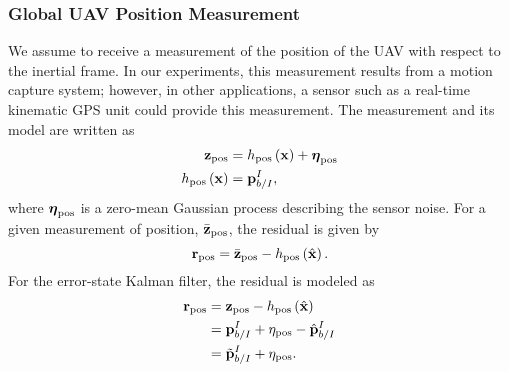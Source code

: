 \subsubsection{Global UAV Position Measurement}
We assume to receive a measurement of the position of the UAV with respect to
the inertial frame.
In our experiments, this measurement results from a motion capture system;
however, in other applications,
a sensor such as a real-time kinematic GPS unit could provide this measurement.
The measurement and its model are
written as
\begin{align}
  \boldsymbol{\mathrm{z}}_{\text{pos}} &= h_{\text{pos}} \left( \boldsymbol{\mathrm{x}} \right) + \boldsymbol{\mathrm{\eta}}_{\text{pos}} \\
  h_{\text{pos}} \left( \boldsymbol{\mathrm{x}} \right) &= \boldsymbol{\mathrm{p}}_{b/I}^I,
\end{align}
where $\boldsymbol{\mathrm{\eta}}_{\text{pos}}$ is a zero-mean Gaussian process
describing the sensor noise.
For a given measurement of position, $\bar{\boldsymbol{\mathrm{z}}}_{\text{pos}}$, the residual is
given by
\begin{equation}
  \boldsymbol{\mathrm{r}}_{\text{pos}} = \bar{\boldsymbol{\mathrm{z}}}_{\text{pos}} - h_{\text{pos}} \left( \hat{\boldsymbol{\mathrm{x}}}
  \right).
\end{equation}
For the error-state Kalman filter, the residual is modeled as
\begin{align}
  \boldsymbol{\mathrm{r}}_{\text{pos}} &=  \boldsymbol{\mathrm{z}}_{\text{pos}} - h_{\text{pos}} \left( \hat{\boldsymbol{\mathrm{x}}}
  \right) \\
                        &= \boldsymbol{\mathrm{p}}_{b/I}^I + \eta_{\text{pos}} -
                        \hat{\boldsymbol{\mathrm{p}}}_{b/I}^I \\
                        &= \tilde{\boldsymbol{\mathrm{p}}}_{b/I}^I + \eta_{\text{pos}}.
\end{align}
